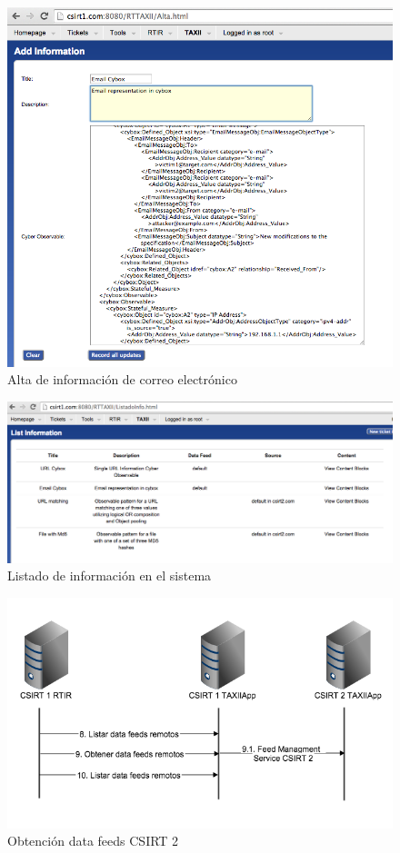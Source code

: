 \begin{figure}[H]
	\centering
	\includegraphics[scale=0.6]{caso-de-estudio/alta.png}
	\caption{Alta de información de correo electrónico}
	\label{fig.altacorreo}
\end{figure}

\begin{figure}[H]
	\centering
	\includegraphics[scale=0.3]{caso-de-estudio/listadoInfo.png}
	\caption{Listado de información en el sistema}
	\label{fig.lstinfo}
\end{figure}

\begin{figure}[H]
	\centering
	\includegraphics[scale=0.6]{flujos/flujo8-10.png}
	\caption{Obtención data feeds CSIRT 2}
	\label{fig.flujos810}
\end{figure}

